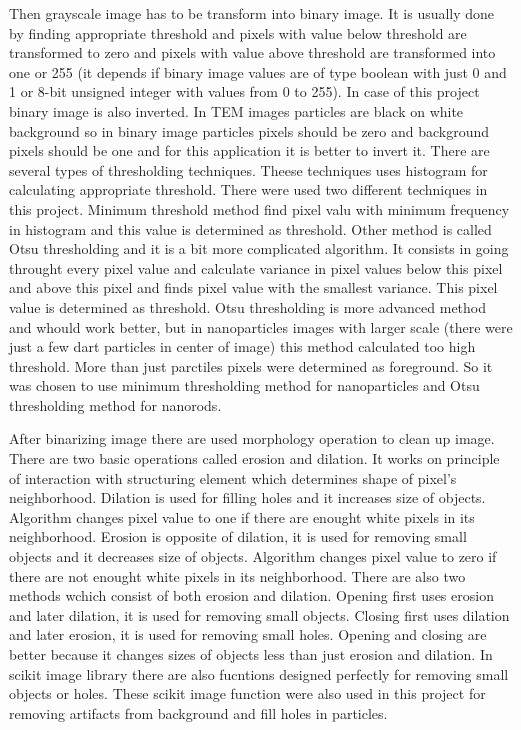 Then grayscale image has to be transform into binary image. It is usually done
by finding appropriate threshold and pixels with value below threshold are 
transformed to zero and pixels with value above threshold are transformed into
one or 255 (it depends if binary image values are of type boolean with just 0 and 1
or 8-bit unsigned integer with values from 0 to 255). In case of this project
binary image is also inverted. In TEM images particles are black on white background
so in binary image particles pixels should be zero and background pixels should be one
and for this application it is better to invert it. There are several types of
thresholding techniques. Theese techniques uses histogram for calculating
appropriate threshold. There were used two different techniques in this project.
Minimum threshold method find pixel valu with minimum frequency in histogram and
this value is determined as threshold. Other method is called Otsu thresholding
and it is a bit more complicated algorithm. It consists in going throught every
pixel value and calculate variance in pixel values below this pixel and above this pixel
and finds pixel value with the smallest variance. This pixel value is determined as
threshold. Otsu thresholding is more advanced method and whould work better, but
in nanoparticles images with larger scale (there were just a few dart particles in center
of image) this method calculated too high threshold. More than just parctiles pixels
were determined as foreground. So it was chosen to use minimum thresholding method for
nanoparticles and Otsu thresholding method for nanorods.

After binarizing image there are used morphology operation to clean up image.
There are two basic operations called erosion and dilation. It works on principle
of interaction with structuring element which determines shape of pixel's neighborhood.
Dilation is used for filling holes and it increases size of objects. Algorithm changes pixel
value to one if there are enought white pixels in its neighborhood. Erosion is opposite
of dilation, it is used for removing small objects and it decreases size of objects.
Algorithm changes pixel value to zero if there are not enought white pixels in its
neighborhood. There are also two methods wchich consist of both erosion and dilation.
Opening first uses erosion and later dilation, it is used for removing small objects.
Closing first uses dilation and later erosion, it is used for removing small holes.
Opening and closing are better because it changes sizes of objects less than just erosion
and dilation. In scikit image library there are also fucntions designed perfectly
for removing small objects or holes. These scikit image function were also used
in this project for removing artifacts from background and fill holes in particles.

